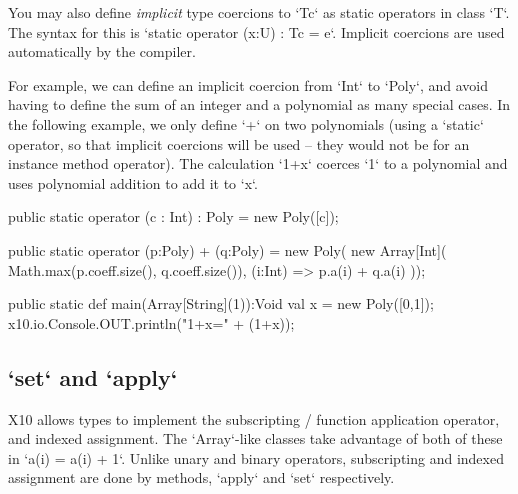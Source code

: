 You may also define {\em implicit} type coercions to \xcd`T{c}` as static
operators in class \xcd`T`.  The syntax for this is
\xcd`static operator (x:U) : T{c} = e`.
Implicit coercions are used automatically by the compiler.  

For example, we can define an implicit coercion from \xcd`Int` to \xcd`Poly`,
and avoid having to define the sum of an integer and a polynomial
as many special cases.  In the following example, we only define \xcd`+` on
two polynomials (using a \xcd`static` operator, so that implicit coercions
will be used -- they would not be for an instance method operator).  The
calculation \xcd`1+x` coerces \xcd`1` to a polynomial and uses polynomial
addition to add it to \xcd`x`.


\begin{xten}
  public static operator (c : Int) : Poly = new Poly([c]);

  public static operator (p:Poly) + (q:Poly) = new Poly(
      new Array[Int](
        Math.max(p.coeff.size(), q.coeff.size()),
        (i:Int) => p.a(i) + q.a(i)
     ));

  public static def main(Array[String](1)):Void {
     val x = new Poly([0,1]);
     x10.io.Console.OUT.println("1+x=" + (1+x));
  }
\end{xten}


\subsection{\xcd`set` and \xcd`apply`}
\index{()}
\index{()=}
\label{set-and-apply}
X10 allows types to implement the subscripting / function application
operator, and indexed assignment.  The \xcd`Array`-like classes take advantage
of both of these in \xcd`a(i) = a(i) + 1`.  Unlike unary and binary operators,
subscripting and indexed assignment are done by methods, \xcd`apply` and
\xcd`set` respectively.

